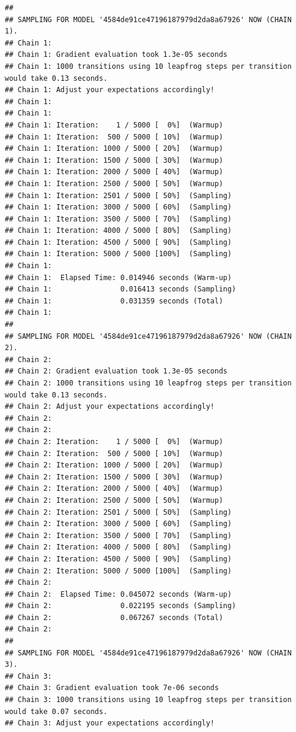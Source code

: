 \documentclass[
  12pt,
]{book}
\theoremstyle{definition}
\theoremstyle{definition}
\theoremstyle{definition}
\theoremstyle{remark}
\begin{document}
\begin{verbatim}
## 
## SAMPLING FOR MODEL '4584de91ce47196187979d2da8a67926' NOW (CHAIN 1).
## Chain 1: 
## Chain 1: Gradient evaluation took 1.3e-05 seconds
## Chain 1: 1000 transitions using 10 leapfrog steps per transition would take 0.13 seconds.
## Chain 1: Adjust your expectations accordingly!
## Chain 1: 
## Chain 1: 
## Chain 1: Iteration:    1 / 5000 [  0%]  (Warmup)
## Chain 1: Iteration:  500 / 5000 [ 10%]  (Warmup)
## Chain 1: Iteration: 1000 / 5000 [ 20%]  (Warmup)
## Chain 1: Iteration: 1500 / 5000 [ 30%]  (Warmup)
## Chain 1: Iteration: 2000 / 5000 [ 40%]  (Warmup)
## Chain 1: Iteration: 2500 / 5000 [ 50%]  (Warmup)
## Chain 1: Iteration: 2501 / 5000 [ 50%]  (Sampling)
## Chain 1: Iteration: 3000 / 5000 [ 60%]  (Sampling)
## Chain 1: Iteration: 3500 / 5000 [ 70%]  (Sampling)
## Chain 1: Iteration: 4000 / 5000 [ 80%]  (Sampling)
## Chain 1: Iteration: 4500 / 5000 [ 90%]  (Sampling)
## Chain 1: Iteration: 5000 / 5000 [100%]  (Sampling)
## Chain 1: 
## Chain 1:  Elapsed Time: 0.014946 seconds (Warm-up)
## Chain 1:                0.016413 seconds (Sampling)
## Chain 1:                0.031359 seconds (Total)
## Chain 1: 
## 
## SAMPLING FOR MODEL '4584de91ce47196187979d2da8a67926' NOW (CHAIN 2).
## Chain 2: 
## Chain 2: Gradient evaluation took 1.3e-05 seconds
## Chain 2: 1000 transitions using 10 leapfrog steps per transition would take 0.13 seconds.
## Chain 2: Adjust your expectations accordingly!
## Chain 2: 
## Chain 2: 
## Chain 2: Iteration:    1 / 5000 [  0%]  (Warmup)
## Chain 2: Iteration:  500 / 5000 [ 10%]  (Warmup)
## Chain 2: Iteration: 1000 / 5000 [ 20%]  (Warmup)
## Chain 2: Iteration: 1500 / 5000 [ 30%]  (Warmup)
## Chain 2: Iteration: 2000 / 5000 [ 40%]  (Warmup)
## Chain 2: Iteration: 2500 / 5000 [ 50%]  (Warmup)
## Chain 2: Iteration: 2501 / 5000 [ 50%]  (Sampling)
## Chain 2: Iteration: 3000 / 5000 [ 60%]  (Sampling)
## Chain 2: Iteration: 3500 / 5000 [ 70%]  (Sampling)
## Chain 2: Iteration: 4000 / 5000 [ 80%]  (Sampling)
## Chain 2: Iteration: 4500 / 5000 [ 90%]  (Sampling)
## Chain 2: Iteration: 5000 / 5000 [100%]  (Sampling)
## Chain 2: 
## Chain 2:  Elapsed Time: 0.045072 seconds (Warm-up)
## Chain 2:                0.022195 seconds (Sampling)
## Chain 2:                0.067267 seconds (Total)
## Chain 2: 
## 
## SAMPLING FOR MODEL '4584de91ce47196187979d2da8a67926' NOW (CHAIN 3).
## Chain 3: 
## Chain 3: Gradient evaluation took 7e-06 seconds
## Chain 3: 1000 transitions using 10 leapfrog steps per transition would take 0.07 seconds.
## Chain 3: Adjust your expectations accordingly!

\end{verbatim}
\end{document}
